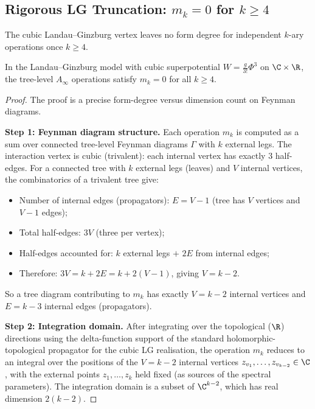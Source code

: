 \subsection{Rigorous LG Truncation: $m_k = 0$ for $k \geq 4$}
\label{subsec:truncation_complete}

The cubic Landau--Ginzburg vertex leaves no form degree for independent
$k$-ary operations once $k\geq 4$.

\begin{theorem}
\label{thm:LG_truncation_full}
In the Landau--Ginzburg model with cubic superpotential $W = \frac{g}{3!}\Phi^3$ on $\C \times \R$, the tree-level $A_\infty$ operations satisfy $m_k = 0$ for all $k \geq 4$.
\end{theorem}

\begin{proof}
The proof is a precise form-degree versus dimension count on Feynman diagrams.

\textbf{Step 1: Feynman diagram structure.}
Each operation $m_k$ is computed as a sum over connected tree-level Feynman diagrams $\Gamma$ with $k$ external legs. The interaction vertex is cubic (trivalent): each internal vertex has exactly $3$ half-edges. For a connected tree with $k$ external legs (leaves) and $V$ internal vertices, the combinatorics of a trivalent tree give:
\begin{itemize}
\item Number of internal edges (propagators): $E = V - 1$ (tree has $V$ vertices and $V-1$ edges);
\item Total half-edges: $3V$ (three per vertex);
\item Half-edges accounted for: $k$ external legs $+$ $2E$ from internal edges;
\item Therefore: $3V = k + 2E = k + 2(V-1)$, giving $V = k - 2$.
\end{itemize}
So a tree diagram contributing to $m_k$ has exactly $V = k-2$ internal vertices and $E = k-3$ internal edges (propagators).

\textbf{Step 2: Integration domain.}
After integrating over the topological ($\R$) directions using the
delta-function support of the standard holomorphic-topological
propagator for the cubic LG realisation, the operation $m_k$ reduces to
an integral over the positions of the $V = k-2$ internal vertices
$z_{v_1}, \ldots, z_{v_{k-2}} \in \C$, with the external points
$z_1, \ldots, z_k$ held fixed (as sources of the spectral parameters).
The integration domain is a subset of $\C^{k-2}$, which has real
dimension $2(k-2)$.


\end{proof}
